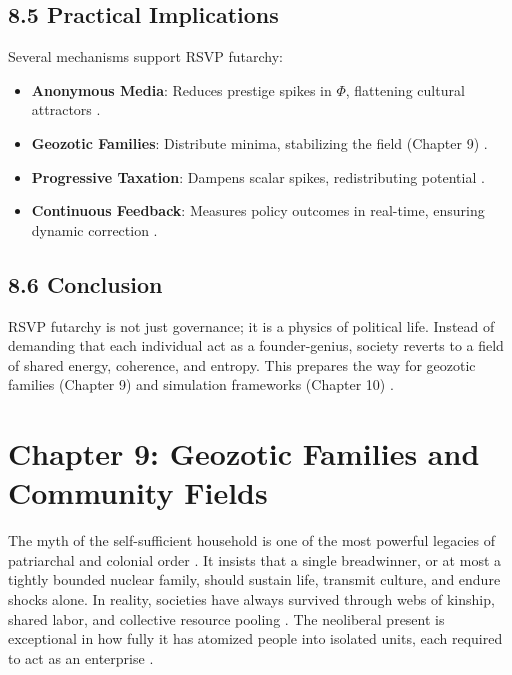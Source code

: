 \documentclass[12pt]{article}
\begin{document}
\subsection*{8.5 Practical Implications}
Several mechanisms support RSVP futarchy:
\begin{itemize}
    \item \textbf{Anonymous Media}: Reduces prestige spikes in \(\Phi\), flattening cultural attractors \citep{lanier2018}.
    \item \textbf{Geozotic Families}: Distribute minima, stabilizing the field (Chapter 9) \citep{deleuze1987}.
    \item \textbf{Progressive Taxation}: Dampens scalar spikes, redistributing potential \citep{zuboff2019}.
    \item \textbf{Continuous Feedback}: Measures policy outcomes in real-time, ensuring dynamic correction \citep{hanson2003}.
\end{itemize}
\subsection*{8.6 Conclusion}
RSVP futarchy is not just governance; it is a physics of political life. Instead of demanding that each individual act as a founder-genius, society reverts to a field of shared energy, coherence, and entropy. This prepares the way for geozotic families (Chapter 9) and simulation frameworks (Chapter 10) \citep{whitehead1978}.
\section*{Chapter 9: Geozotic Families and Community Fields}
The myth of the self-sufficient household is one of the most powerful legacies of patriarchal and colonial order \citep{ortega1957}. It insists that a single breadwinner, or at most a tightly bounded nuclear family, should sustain life, transmit culture, and endure shocks alone. In reality, societies have always survived through webs of kinship, shared labor, and collective resource pooling \citep{deleuze1987}. The neoliberal present is exceptional in how fully it has atomized people into isolated units, each required to act as an enterprise \citep{zuboff2019}.
\end{document}
